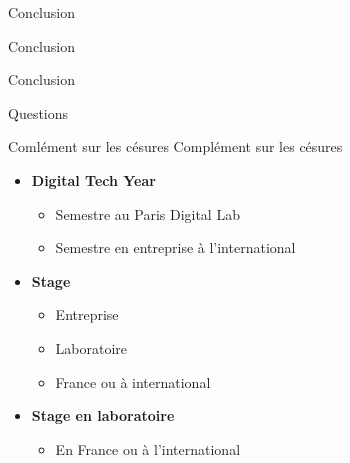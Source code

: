 \documentclass[french, 12pt]{beamer}
\begin{document}


\begin{frame}{Conclusion}
\begin{center}
    \huge{Conclusion}
\end{center}
\end{frame}

\begin{frame}{Conclusion}
    \begin{center}
        \huge{Questions}
    \end{center}
\end{frame}

\begin{frame}{Comlément sur les césures}
Complément sur les césures
\begin{itemize}
    \item \textbf{Digital Tech Year}
    \begin{itemize}
        \item Semestre au Paris Digital Lab
        \item Semestre en entreprise à l'international
    \end{itemize}
    \item \textbf{Stage}
    \begin{itemize}
        \item Entreprise
        \item Laboratoire
        \item France ou à international
    \end{itemize}
    \item \textbf{Stage en laboratoire}
    \begin{itemize}
        \item En France ou à l'international
    \end{itemize}
\end{itemize}
\end{frame}
\end{document}

